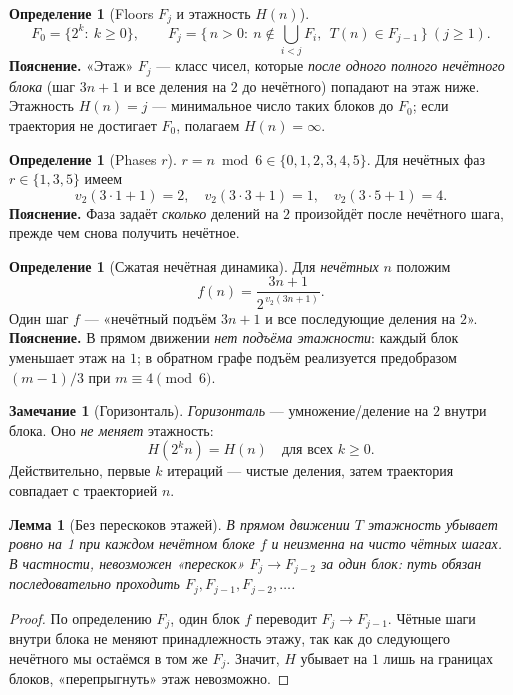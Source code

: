 \documentclass[a4paper,12pt]{article}
\theoremstyle{plain}
\newtheorem{lemma}[theorem]{Лемма}
\theoremstyle{definition}
\newtheorem{definition}[theorem]{Определение}
\newtheorem{remark}[theorem]{Замечание}
\begin{document}
\begin{definition}[Floors $F_j$ и этажность $H(n)$]\label{def:floors}
\begin{equation}\label{eq:floors}
F_0=\{2^k:\ k\ge0\},\qquad
F_j=\bigl\{\,n>0:\ n\notin\bigcup_{i<j}F_i,\ \ T(n)\in F_{j-1}\,\bigr\}\ (j\ge1).
\end{equation}
\textbf{Пояснение.} «Этаж» $F_j$ — класс чисел, которые \emph{после одного полного нечётного блока} (шаг $3n+1$ и все деления на $2$ до нечётного) попадают на этаж ниже. Этажность $H(n)=j$ — минимальное число таких блоков до $F_0$; если траектория не достигает $F_0$, полагаем $H(n)=\infty$.
\end{definition}

\begin{definition}[Phases $r$]\label{def:phases}
$r=n\bmod6\in\{0,1,2,3,4,5\}$. Для нечётных фаз $r\in\{1,3,5\}$ имеем
\begin{equation}\label{eq:v2byphase}
v_2(3\cdot1+1)=2,\quad v_2(3\cdot3+1)=1,\quad v_2(3\cdot5+1)=4.
\end{equation}
\textbf{Пояснение.} Фаза задаёт \emph{сколько} делений на $2$ произойдёт после нечётного шага, прежде чем снова получить нечётное.
\end{definition}

\begin{definition}[Сжатая нечётная динамика]\label{def:f}
Для \emph{нечётных} $n$ положим
\begin{equation}\label{eq:fdef}
f(n)=\frac{3n+1}{2^{\,v_2(3n+1)}}.
\end{equation}
Один шаг $f$ — «нечётный подъём $3n+1$ и все последующие деления на $2$». 
\textbf{Пояснение.} В прямом движении \emph{нет подъёма этажности}: каждый блок уменьшает этаж на $1$; в обратном графе подъём реализуется предобразом $(m-1)/3$ при $m\equiv4\pmod6$.
\end{definition}

\begin{remark}[Горизонталь]\label{rem:horizontal}
\emph{Горизонталь} — умножение/деление на $2$ внутри блока. Оно \emph{не меняет} этажность: 
\begin{equation}\label{eq:horizontal}
H(2^k n)=H(n)\quad\text{для всех }k\ge0.
\end{equation}
Действительно, первые $k$ итераций — чистые деления, затем траектория совпадает с траекторией $n$.
\end{remark}

\begin{lemma}[Без перескоков этажей]\label{lem:no-skip}
В прямом движении $T$ этажность убывает \emph{ровно на 1} при каждом нечётном блоке $f$ и неизменна на чисто чётных шагах. В частности, невозможен «перескок» $F_j\to F_{j-2}$ за один блок: путь обязан последовательно проходить $F_j, F_{j-1}, F_{j-2},\dots$.
\end{lemma}
\begin{proof}
По определению $F_j$, один блок $f$ переводит $F_j\to F_{j-1}$. Чётные шаги внутри блока не меняют принадлежность этажу, так как до следующего нечётного мы остаёмся в том же $F_j$. Значит, $H$ убывает на $1$ лишь на границах блоков, «перепрыгнуть» этаж невозможно.
\end{proof}
\end{document}
